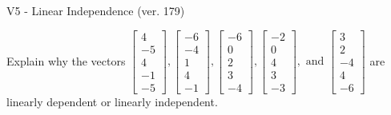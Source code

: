 \begin{exercise}
  \begin{exerciseTitle}V5 - Linear Independence (ver. 179)\end{exerciseTitle}
  \begin{exerciseStatement}
    Explain why the vectors \(\left[\begin{array}{r}
4 \\
-5 \\
4 \\
-1 \\
-5
\end{array}\right] , \left[\begin{array}{r}
-6 \\
-4 \\
1 \\
4 \\
-1
\end{array}\right] , \left[\begin{array}{r}
-6 \\
0 \\
2 \\
3 \\
-4
\end{array}\right] , \left[\begin{array}{r}
-2 \\
0 \\
4 \\
3 \\
-3
\end{array}\right] , \text{ and } \left[\begin{array}{r}
3 \\
2 \\
-4 \\
4 \\
-6
\end{array}\right]\) are linearly dependent or linearly independent.	



\end{exerciseStatement}
\end{exercise}
